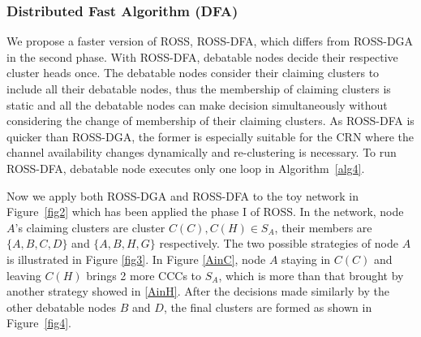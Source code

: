 \documentclass[10pt,journal,compsoc]{IEEEtran}
\theoremstyle{mytheoremstyle}
\theoremstyle{mytheoremstyle}
\theoremstyle{mytheoremstyle}
\begin{document}
\subsubsection{Distributed Fast Algorithm (DFA)}
We propose a faster version of ROSS, ROSS-DFA, which differs from ROSS-DGA in the second phase.
With ROSS-DFA, debatable nodes decide their respective cluster heads once.
The debatable nodes consider their claiming clusters to include all their debatable nodes, thus the membership of claiming clusters is static and all the debatable nodes can make decision simultaneously without considering the change of membership of their claiming clusters.
As ROSS-DFA is quicker than ROSS-DGA, the former is especially suitable for the CRN where the channel availability changes dynamically and re-clustering is necessary.
To run ROSS-DFA, debatable node executes only one loop in Algorithm~\ref{alg4}.

Now we apply both ROSS-DGA and ROSS-DFA to the toy network in Figure~\ref{fig2} which has been applied the phase I of ROSS.
In the network, node $A$'s claiming clusters are cluster $C(C), C(H)\in S_A$, their members are $\{A,B,C,D\}$ and $\{A,B,H,G\}$ respectively. 
The two possible strategies of node $A$ is illustrated in Figure \ref{fig3}.
In Figure \ref{AinC}, node $A$ staying in $C(C)$ and leaving $C(H)$ brings 2 more CCCs to $S_A$, which is more than that brought by another strategy showed in \ref{AinH}.
After the decisions made similarly by the other debatable nodes $B$ and $D$, the final clusters are formed as shown in Figure~\ref{fig4}.

\end{document}
